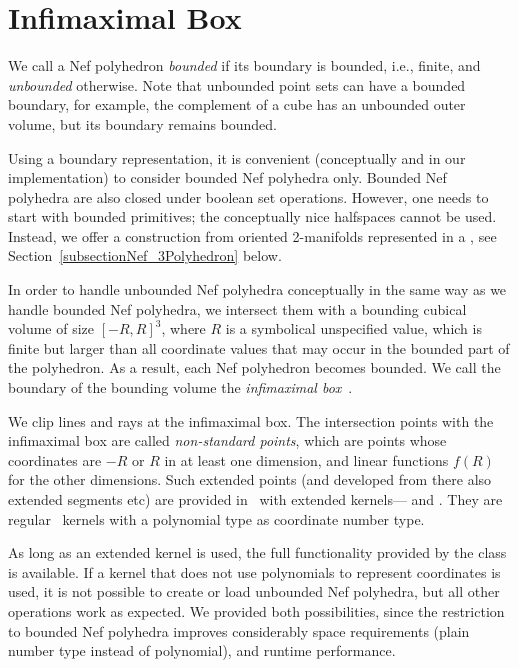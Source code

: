 \section{Infimaximal Box\label{sectionNef_3InfiBox}}

We call a Nef polyhedron \emph{bounded} if its boundary is bounded,
i.e., finite, and \emph{unbounded} otherwise. Note that unbounded
point sets can have a bounded boundary, for example, the complement of
a cube has an unbounded outer volume, but its boundary remains bounded.

Using a boundary representation, it is convenient (conceptually and in
our implementation) to consider bounded Nef polyhedra only.  Bounded
Nef polyhedra are also closed under boolean set operations. However, one
needs to start with bounded primitives; the conceptually nice
halfspaces cannot be used. Instead, we offer a construction from oriented
2-manifolds represented in a  , see
Section~\ref{subsectionNef_3Polyhedron} below.

In order to handle unbounded Nef polyhedra conceptually in the same
way as we handle bounded Nef polyhedra, we intersect them with a
bounding cubical volume of size $[-R,R]^3$, where $R$ is a symbolical
unspecified value, which is finite but larger than all coordinate
values that may occur in the bounded part of the polyhedron. As a
result, each Nef polyhedron becomes bounded.  We call the boundary of
the bounding volume the \emph{infimaximal
  box}~\cite{cgal:sm-iftml-00}.

We clip lines and rays at the infimaximal box. The intersection points
with the infimaximal box are called \emph{non-standard points}, which
are points whose coordinates are $-R$ or $R$ in at least one
dimension, and linear functions $f(R)$ for the other dimensions. Such
extended points (and developed from there also extended segments etc)
are provided in \cgal\ with extended
kernels--- and
.  They are regular \cgal\ kernels
with a polynomial type as coordinate number type.

As long as an extended kernel is used, the full functionality provided
by the  class is available. If a kernel that 
does not use polynomials to represent coordinates is used, it is not 
possible to create or load unbounded Nef
polyhedra, but all other operations work as expected. We provided both
possibilities, since the restriction to bounded Nef polyhedra improves
considerably space requirements (plain number type instead of
polynomial), and runtime performance.


